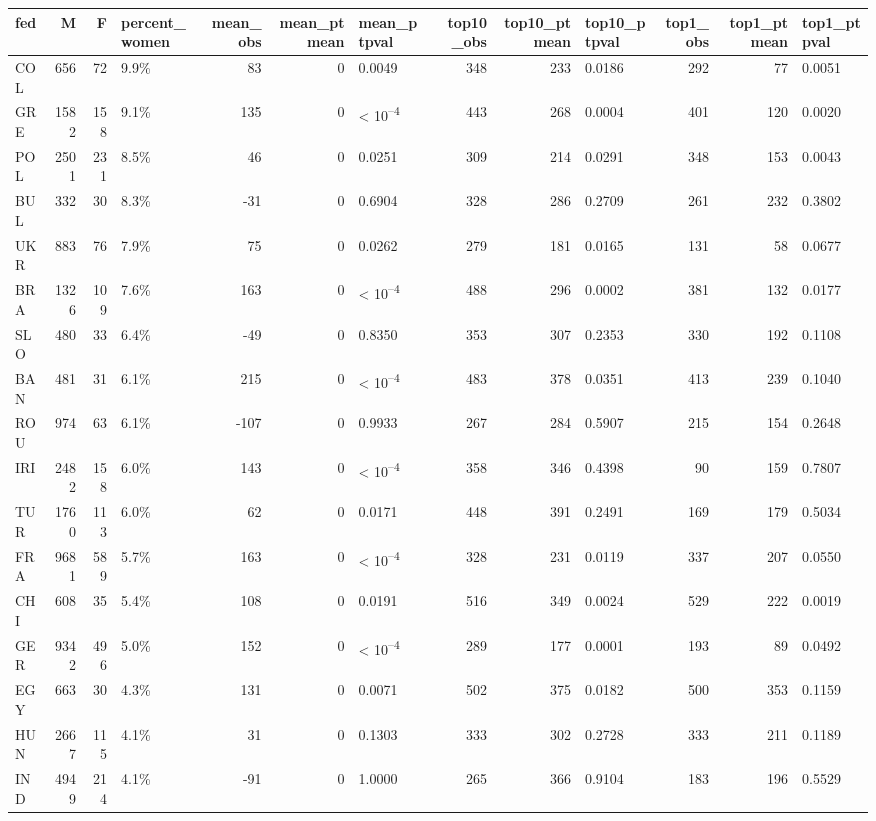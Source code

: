 
\begin{tabular}{l|r|r|l|r|r|l|r|r|l|r|r|l}
\hline
fed & M & F & percent_women & mean_obs & mean_ptmean & mean_ptpval & top10_obs & top10_ptmean & top10_ptpval & top1_obs & top1_ptmean & top1_ptpval\\
\hline
COL & 656 & 72 & 9.9\% & 83 & 0 & 0.0049 & 348 & 233 & 0.0186 & 292 & 77 & 0.0051\\
\hline
GRE & 1582 & 158 & 9.1\% & 135 & 0 & < 10\textsuperscript{--4} & 443 & 268 & 0.0004 & 401 & 120 & 0.0020\\
\hline
POL & 2501 & 231 & 8.5\% & 46 & 0 & 0.0251 & 309 & 214 & 0.0291 & 348 & 153 & 0.0043\\
\hline
BUL & 332 & 30 & 8.3\% & -31 & 0 & 0.6904 & 328 & 286 & 0.2709 & 261 & 232 & 0.3802\\
\hline
UKR & 883 & 76 & 7.9\% & 75 & 0 & 0.0262 & 279 & 181 & 0.0165 & 131 & 58 & 0.0677\\
\hline
BRA & 1326 & 109 & 7.6\% & 163 & 0 & < 10\textsuperscript{--4} & 488 & 296 & 0.0002 & 381 & 132 & 0.0177\\
\hline
SLO & 480 & 33 & 6.4\% & -49 & 0 & 0.8350 & 353 & 307 & 0.2353 & 330 & 192 & 0.1108\\
\hline
BAN & 481 & 31 & 6.1\% & 215 & 0 & < 10\textsuperscript{--4} & 483 & 378 & 0.0351 & 413 & 239 & 0.1040\\
\hline
ROU & 974 & 63 & 6.1\% & -107 & 0 & 0.9933 & 267 & 284 & 0.5907 & 215 & 154 & 0.2648\\
\hline
IRI & 2482 & 158 & 6.0\% & 143 & 0 & < 10\textsuperscript{--4} & 358 & 346 & 0.4398 & 90 & 159 & 0.7807\\
\hline
TUR & 1760 & 113 & 6.0\% & 62 & 0 & 0.0171 & 448 & 391 & 0.2491 & 169 & 179 & 0.5034\\
\hline
FRA & 9681 & 589 & 5.7\% & 163 & 0 & < 10\textsuperscript{--4} & 328 & 231 & 0.0119 & 337 & 207 & 0.0550\\
\hline
CHI & 608 & 35 & 5.4\% & 108 & 0 & 0.0191 & 516 & 349 & 0.0024 & 529 & 222 & 0.0019\\
\hline
GER & 9342 & 496 & 5.0\% & 152 & 0 & < 10\textsuperscript{--4} & 289 & 177 & 0.0001 & 193 & 89 & 0.0492\\
\hline
EGY & 663 & 30 & 4.3\% & 131 & 0 & 0.0071 & 502 & 375 & 0.0182 & 500 & 353 & 0.1159\\
\hline
HUN & 2667 & 115 & 4.1\% & 31 & 0 & 0.1303 & 333 & 302 & 0.2728 & 333 & 211 & 0.1189\\
\hline
IND & 4949 & 214 & 4.1\% & -91 & 0 & 1.0000 & 265 & 366 & 0.9104 & 183 & 196 & 0.5529\\

\end{tabular}
